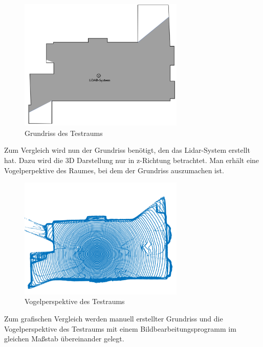 \begin{figure}[H]
	\centering
	\includegraphics[width=0.7\textwidth]{images/Validierung/MitSchatten}
	\caption{Grundriss des Testraums}
	\label{grundrssmitschatte}
\end{figure}


Zum Vergleich wird nun der Grundriss benötigt, den das Lidar-System erstellt hat. Dazu wird die 3D Darstellung nur in z-Richtung betrachtet. Man erhält eine Vogelperpektive des Raumes, bei dem der Grundriss auszumachen ist. 

\begin{figure}[H]
	\centering
	\includegraphics[width=0.7\textwidth]{images/Validierung/Vogelperspektive}
	\caption{Vogelperspektive des Testraums}
	\label{vogelperspektive}
\end{figure}


Zum grafischen Vergleich werden manuell erstellter Grundriss und die Vogelperspektive des Testraums mit einem Bildbearbeitungsprogramm im gleichen Maßstab übereinander gelegt.

